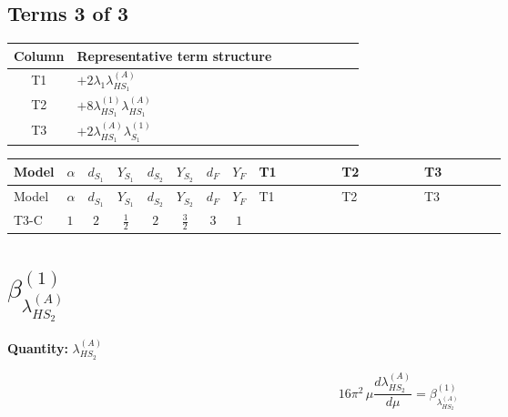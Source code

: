\documentclass[8pt]{article}
\begin{document}
\begin{landscape}
\subsection*{Terms 3 of 3}
\begin{center}
\begin{tabular}{@{}c >{\raggedright\arraybackslash}p{0.82\linewidth}@{}}
\toprule
Column & Representative term structure \\
\midrule
T1 & \(\displaystyle +2 {\lambda_1} {\lambda_{HS_1}^{(A)}}\) \\
\midrule
T2 & \(\displaystyle +8 {\lambda_{HS_1}^{(1)}} {\lambda_{HS_1}^{(A)}}\) \\
\midrule
T3 & \(\displaystyle +2 {\lambda_{HS_1}^{(A)}} {\lambda_{S_1}^{(1)}}\) \\
\midrule
\bottomrule
\end{tabular}
\end{center}
\smallskip
\tiny
\begin{longtable}{@{}llcccccc >{\raggedright\arraybackslash}p{0.21\linewidth} >{\raggedright\arraybackslash}p{0.21\linewidth} >{\raggedright\arraybackslash}p{0.21\linewidth}@{}}
\toprule
Model & $\alpha$ & $d_{S_1}$ & $Y_{S_1}$ & $d_{S_2}$ & $Y_{S_2}$ & $d_F$ & $Y_F$ & T1 & T2 & T3 \\
\midrule
\endfirsthead
\toprule
Model & $\alpha$ & $d_{S_1}$ & $Y_{S_1}$ & $d_{S_2}$ & $Y_{S_2}$ & $d_F$ & $Y_F$ & T1 & T2 & T3 \\
\midrule
\endhead
T3-C & $1$ & $2$ & $\frac{1}{2}$ & $2$ & $\frac{3}{2}$ & $3$ & $1$ & \scriptsize\adjustbox{max width=\linewidth}{$\begin{gathered} +2 {\lambda_1} {\lambda_{HS_1}^{(A)}}\end{gathered}$} & \scriptsize\adjustbox{max width=\linewidth}{$\begin{gathered} +8 {\lambda_{HS_1}^{(1)}} {\lambda_{HS_1}^{(A)}}\end{gathered}$} & \scriptsize\adjustbox{max width=\linewidth}{$\begin{gathered} +2 {\lambda_{HS_1}^{(A)}} {\lambda_{S_1}^{(1)}}\end{gathered}$} \\
\midrule
\bottomrule
\end{longtable}
\clearpage
\section*{$\beta_{\lambda_{HS_2}^{(A)}}^{(1)}$}
\noindent\textbf{Quantity: }$\lambda_{HS_2}^{(A)}$\par\smallskip
\[16\pi^2\,\mu\frac{d \lambda_{HS_2}^{(A)}}{d\mu}=\beta_{\lambda_{HS_2}^{(A)}}^{(1)}\]

\end{landscape}
\end{document}
